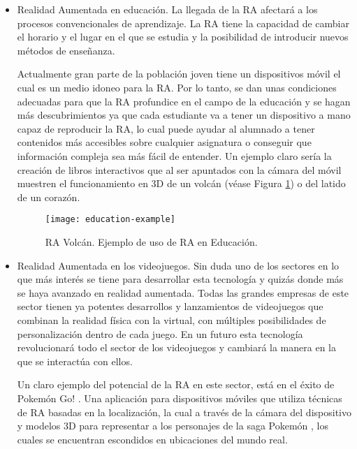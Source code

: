 \begin{itemize}
    \item Realidad Aumentada en educación. La llegada de la RA afectará a los procesos convencionales de aprendizaje. La RA tiene la capacidad de cambiar el horario y el lugar en el que se estudia y la posibilidad de introducir nuevos métodos de enseñanza. 
    
    Actualmente gran parte de la población joven tiene un dispositivos móvil el cual es un medio idoneo para la RA. Por lo tanto, se dan unas condiciones adecuadas para que la RA profundice en el campo de la educación y se hagan más descubrimientos ya que cada estudiante va a tener un dispositivo a mano capaz de reproducir la RA, lo cual puede ayudar al alumnado a tener contenidos más accesibles sobre cualquier asignatura o conseguir que información compleja sea más fácil de entender. Un ejemplo claro sería la creación de libros interactivos que al ser apuntados con la cámara del móvil muestren el funcionamiento en 3D de un volcán (véase Figura \ref{fig:education-example}) o del latido de un corazón.

    \begin{figure}[h]
        \centering
        \texttt{[image: education-example]}
        \caption{RA Volcán. Ejemplo de uso de RA en Educación. }
        \label{fig:education-example}
    \end{figure}
    
    \item Realidad Aumentada en los videojuegos. Sin duda uno de los sectores en lo que más interés se tiene para desarrollar esta tecnología y quizás donde más se haya avanzado en realidad aumentada. Todas las grandes empresas de este sector tienen ya potentes desarrollos y lanzamientos de videojuegos que combinan la realidad física con la virtual, con múltiples posibilidades de personalización dentro de cada juego. En un futuro esta tecnología revolucionará todo el sector de los videojuegos y cambiará la manera en la que se interactúa con ellos.   
    
    Un claro ejemplo del potencial de la RA en este sector, está en el éxito de Pokemón Go! \cite{URL::Pokemon-Go}. Una aplicación para dispositivos móviles que utiliza técnicas de RA basadas en la localización, la cual a través de la cámara del dispositivo y modelos 3D para representar a los personajes de la saga Pokemón \cite{URL::Pokemon}, los cuales se encuentran escondidos en ubicaciones del mundo real.  
    

\end{itemize}
